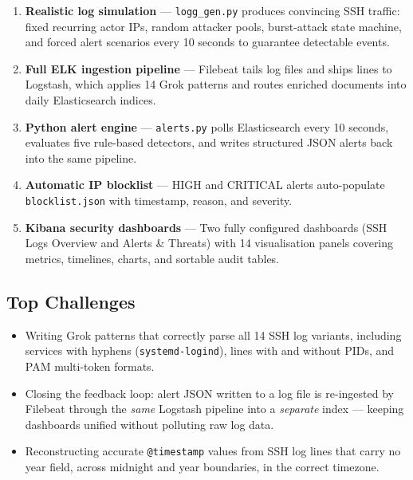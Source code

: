 \documentclass[12pt,a4paper]{article}
\newcommand{\file}[1]{\texttt{\color{accent}#1}}
\newcommand{\field}[1]{\texttt{#1}}
\begin{document}
\begin{enumerate}[leftmargin=2em]
  \item \textbf{Realistic log simulation} — \file{logg\_gen.py} produces
        convincing SSH traffic: fixed recurring actor IPs, random attacker
        pools, burst-attack state machine, and forced alert scenarios every
        10 seconds to guarantee detectable events.
  \item \textbf{Full ELK ingestion pipeline} — Filebeat tails log files and
        ships lines to Logstash, which applies 14 Grok patterns and routes
        enriched documents into daily Elasticsearch indices.
  \item \textbf{Python alert engine} — \file{alerts.py} polls Elasticsearch
        every 10 seconds, evaluates five rule-based detectors, and writes
        structured JSON alerts back into the same pipeline.
  \item \textbf{Automatic IP blocklist} — HIGH and CRITICAL alerts
        auto-populate \file{blocklist.json} with timestamp, reason, and
        severity.
  \item \textbf{Kibana security dashboards} — Two fully configured dashboards
        (SSH Logs Overview and Alerts \& Threats) with 14 visualisation panels
        covering metrics, timelines, charts, and sortable audit tables.
\end{enumerate}

\subsection*{Top Challenges}

\begin{itemize}[leftmargin=2em]
  \item Writing Grok patterns that correctly parse all 14 SSH log variants,
        including services with hyphens (\texttt{systemd-logind}), lines
        with and without PIDs, and PAM multi-token formats.
  \item Closing the feedback loop: alert JSON written to a log file is
        re-ingested by Filebeat through the \emph{same} Logstash pipeline
        into a \emph{separate} index — keeping dashboards unified without
        polluting raw log data.
  \item Reconstructing accurate \field{@timestamp} values from SSH log lines
        that carry no year field, across midnight and year boundaries, in the
        correct timezone.
\end{itemize}
\end{document}
